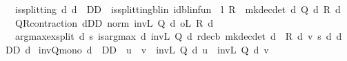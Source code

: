\begin{isabellebody}
\ \ \ is{\isacharunderscore}{\kern0pt}splitting{\isacharcolon}{\kern0pt}\ {\isachardoublequoteopen}{\isasymAnd}d{\isachardot}{\kern0pt}\ d\ {\isasymin}\ D\isactrlsub D\ {\isasymLongrightarrow}\ is{\isacharunderscore}{\kern0pt}splitting{\isacharunderscore}{\kern0pt}blin\ {\isacharparenleft}{\kern0pt}id{\isacharunderscore}{\kern0pt}blinfun\ {\isacharminus}{\kern0pt}\ l\ {\isacharasterisk}{\kern0pt}\isactrlsub R\ {\isasymP}\ {\isacharparenleft}{\kern0pt}mk{\isacharunderscore}{\kern0pt}dec{\isacharunderscore}{\kern0pt}det\ d{\isacharparenright}{\kern0pt}{\isacharparenright}{\kern0pt}\ {\isacharparenleft}{\kern0pt}Q\ d{\isacharparenright}{\kern0pt}\ {\isacharparenleft}{\kern0pt}R\ d{\isacharparenright}{\kern0pt}{\isachardoublequoteclose}\isanewline
\ \ \ QR{\isacharunderscore}{\kern0pt}contraction{\isacharcolon}{\kern0pt}\ {\isachardoublequoteopen}{\isacharparenleft}{\kern0pt}{\isasymSqunion}d{\isasymin}D\isactrlsub D{\isachardot}{\kern0pt}\ norm\ {\isacharparenleft}{\kern0pt}inv\isactrlsub L\ {\isacharparenleft}{\kern0pt}Q\ d{\isacharparenright}{\kern0pt}\ o\isactrlsub L\ R\ d{\isacharparenright}{\kern0pt}{\isacharparenright}{\kern0pt}\ {\isacharless}{\kern0pt}\ {}{\isachardoublequoteclose}\isanewline
\ \ \ arg{\isacharunderscore}{\kern0pt}max{\isacharunderscore}{\kern0pt}ex{\isacharunderscore}{\kern0pt}split{\isacharcolon}{\kern0pt}\ {\isachardoublequoteopen}{\isasymexists}d{\isachardot}{\kern0pt}\ {\isasymforall}s{\isachardot}{\kern0pt}\ is{\isacharunderscore}{\kern0pt}arg{\isacharunderscore}{\kern0pt}max\ {\isacharparenleft}{\kern0pt}{\isasymlambda}d{\isachardot}{\kern0pt}\ inv\isactrlsub L\ {\isacharparenleft}{\kern0pt}Q\ d{\isacharparenright}{\kern0pt}\ {\isacharparenleft}{\kern0pt}r{\isacharunderscore}{\kern0pt}dec\isactrlsub b\ {\isacharparenleft}{\kern0pt}mk{\isacharunderscore}{\kern0pt}dec{\isacharunderscore}{\kern0pt}det\ d{\isacharparenright}{\kern0pt}\ {\isacharplus}{\kern0pt}\ R\ d\ v{\isacharparenright}{\kern0pt}\ s{\isacharparenright}{\kern0pt}\ {\isacharparenleft}{\kern0pt}{\isasymlambda}d{\isachardot}{\kern0pt}\ d\ {\isasymin}\ D\isactrlsub D{\isacharparenright}{\kern0pt}\ d{\isachardoublequoteclose}\isanewline
{}\isanewline
\isanewline
{}\isamarkupfalse%
\ inv{\isacharunderscore}{\kern0pt}Q{\isacharunderscore}{\kern0pt}mono{\isacharcolon}{\kern0pt}\ {\isachardoublequoteopen}d\ {\isasymin}\ D\isactrlsub D\ {\isasymLongrightarrow}\ u\ {\isasymle}\ v\ {\isasymLongrightarrow}\ {\isacharparenleft}{\kern0pt}inv\isactrlsub L\ {\isacharparenleft}{\kern0pt}Q\ d{\isacharparenright}{\kern0pt}{\isacharparenright}{\kern0pt}\ u\ {\isasymle}\ {\isacharparenleft}{\kern0pt}inv\isactrlsub L\ {\isacharparenleft}{\kern0pt}Q\ d{\isacharparenright}{\kern0pt}{\isacharparenright}{\kern0pt}\ v{\isachardoublequoteclose}\isanewline

\end{isabellebody}
